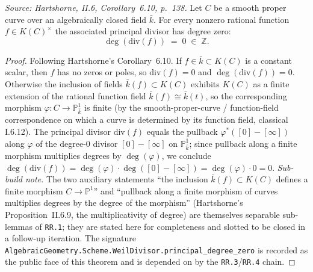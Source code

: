 \begin{theorem}
  \label{thm:principal_deg_zero}
  \textit{Source: Hartshorne, II.6, Corollary~6.10, p.~138.}
  Let \(C\) be a smooth proper curve over an algebraically closed field
  \(\bar k\). For every nonzero rational function \(f \in K(C)^{\times}\) the
  associated principal divisor has degree zero:
  \[
    \deg(\mathrm{div}(f)) \;=\; 0 \;\in\; \mathbb Z.
  \]
\end{theorem}
\begin{proof}
  Following Hartshorne's Corollary~6.10. If \(f \in \bar k \subset K(C)\) is
  a constant scalar, then \(f\) has no zeros or poles, so \(\mathrm{div}(f) = 0\) and
  \(\deg(\mathrm{div}(f)) = 0\). Otherwise the inclusion of fields
  \(\bar k(f) \subset K(C)\) exhibits \(K(C)\) as a finite extension of the
  rational function field \(\bar k(f) \cong \bar k(t)\), so the corresponding
  morphism \(\varphi \colon C \to \mathbb P^1_{\bar k}\) is finite (by the
  smooth-proper-curve / function-field correspondence on which a curve is
  determined by its function field, classical I.6.12). The principal
  divisor \(\mathrm{div}(f)\) equals the pullback \(\varphi^{*}([0] - [\infty])\)
  along \(\varphi\) of the degree-\(0\) divisor \([0] - [\infty]\) on
  \(\mathbb P^1_{\bar k}\); since pullback along a finite morphism
  multiplies degrees by \(\deg(\varphi)\), we conclude
  $\deg(\mathrm{div}(f)) = \deg(\varphi) \cdot \deg([0] - [\infty]) = \deg(\varphi)
  \cdot 0 = 0$.
  \emph{Sub-build note.} The two auxiliary statements ``the inclusion
  \(\bar k(f) \subset K(C)\) defines a finite morphism \(C \to \mathbb P^1\)''
  and ``pullback along a finite morphism of curves multiplies degrees by
  the degree of the morphism'' (Hartshorne's Proposition~II.6.9, the
  multiplicativity of degree) are themselves separable sub-lemmas of
  \texttt{RR.1}; they are stated here for completeness and slotted to be
  closed in a follow-up iteration. The signature
  \texttt{AlgebraicGeometry.Scheme.WeilDivisor.principal\_degree\_zero}
  is recorded as the public face of this theorem and is depended on by
  the \texttt{RR.3}/\texttt{RR.4} chain.
\end{proof}
